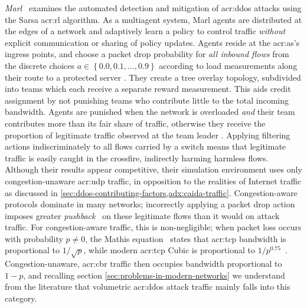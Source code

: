 \emph{Marl}~\parencite{DBLP:conf/iaai/MalialisK13,DBLP:journals/eaai/MalialisK15} examines the automated detection and mitigation of \gls{acr:ddos} attacks using the Sarsa \gls{acr:rl} algorithm.
As a multiagent system, Marl agents are distributed at the edges of a network and adaptively learn a policy to control traffic \emph{without} explicit communication or sharing of policy updates.
Agents reside at the \gls{acr:as}'s ingress points, and choose a packet drop probability for \emph{all inbound flows} from the discrete choices $a\in\left\{0.0,0.1,...,0.9\right\}$ \prllitact{} according to load measurements along their route to a protected server \prllitstate.
They create a tree overlay topology, subdivided into teams which each receive a separate reward measurement.
This aids credit assignment by not punishing teams who contribute little to the total incoming bandwidth.
Agents are punished when the network is overloaded \emph{and} their team contributes more than its fair share of traffic, otherwise they receive the proportion of legitimate traffic observed at the team leader \prllitreward.
Applying filtering actions indiscriminately to all flows carried by a switch means that legitimate traffic is easily caught in the crossfire, indirectly harming harmless flows.
Although their results appear competitive, their simulation environment uses only congestion-unaware \gls{acr:udp} traffic, in opposition to the realities of Internet traffic as discussed in \cref{sec:ddos-contributing-factors,adx:caida-traffic}.
Congestion-aware protocols dominate in many networks; incorrectly applying a packet drop action imposes greater \emph{pushback}~\parencite{DBLP:journals/ccr/MahajanBFIPS02a} on these legitimate flows than it would on attack traffic.
For congestion-aware traffic, this is non-negligible; when packet loss occurs with probability $p\ne0$, the Mathis equation~\parencite{DBLP:journals/ccr/MathisSMO97} states that \gls{acr:tcp} bandwidth is proportional to $1/\sqrt{p}$, while modern \gls{acr:tcp} Cubic is proportional to $1/p^{0.75}$~\parencite{rfc8312}.
Congestion-unaware, \gls{acr:cbr} traffic then occupies bandwidth proportional to $1 - p$, and recalling section \cref{sec:problems-in-modern-networks} we understand from the literature that volumetric \gls{acr:ddos} attack traffic mainly falls into this category.
